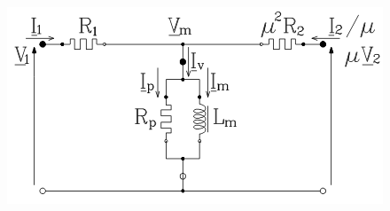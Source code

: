 		\begin{center}
		\includegraphics[scale=0.54]{ch3/imager2.png}
		\label{fig:SchNnPrftStdr}
		\end{center}			
	
